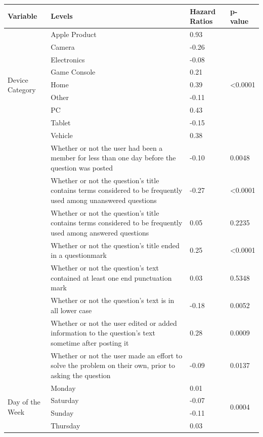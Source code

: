 \documentclass{article}
\begin{document}
\begin{table}[!htbp]
\centering
\begin{tabular}{|p{1.5cm}|p{6cm}|p{2.5cm}|p{2.5cm}|}
  \hline
 \textbf{Variable} & \textbf{Levels} & \textbf{Hazard Ratios} & \textbf{p-value} \\ 
  \hline
  \multirow{ 9 }{ 2 cm }{ Device Category } & Apple Product & 0.93 & \multirow{ 9 }{ 1.5cm }{ <0.0001 }\\ 
  & Camera & -0.26 & \\ 
  & Electronics & -0.08 &\\ 
  & Game Console & 0.21 &\\ 
  & Home & 0.39 &\\ 
  & Other & -0.11 &\\ 
  & PC & 0.43 &\\ 
  & Tablet & -0.15 &\\ 
  & Vehicle & 0.38 &\\
  \hline
  & Whether or not the user had been a member for less than one day before the question was posted & -0.10 & 0.0048 \\
  \hline
  & Whether or not the question's title contains terms considered to be frequently used among unanswered questions & -0.27 & <0.0001 \\ 
  \hline
  & Whether or not the question's title contains terms considered to be frequently used among answered questions & 0.05 & 0.2235\\ 
  \hline
  & Whether or not the question's title ended in a questionmark & 0.25 & <0.0001\\ 
  \hline
  & Whether or not the question's text contained at least one end punctuation mark & 0.03 & 0.5348\\ 
  \hline
  & Whether or not the question's text is in all lower case & -0.18 & 0.0052 \\ 
  \hline
  & Whether or not the user edited or added information to the question's text sometime after posting it & 0.28 & 0.0009 \\ 
  \hline
  & Whether or not the user made an effort to solve the problem on their own, prior to asking the question & -0.09 & 0.0137 \\ 
  \hline
  \multirow{ 6 }{ 2 cm }{ Day of the Week } & Monday & 0.01 & \multirow{ 6 }{ 1.5cm }{ 0.0004 }\\ 
  & Saturday & -0.07 & \\ 
  & Sunday & -0.11 & \\ 
  & Thursday & 0.03 & \\ 

\end{tabular}
\end{table}
\end{document}
